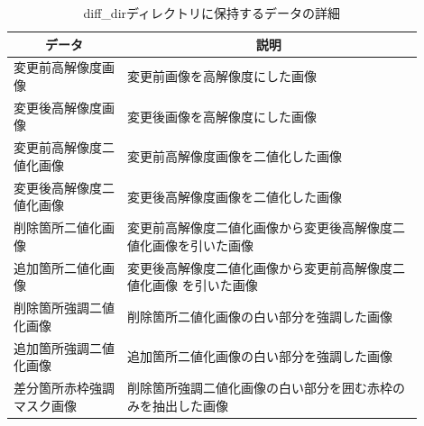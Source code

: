 \begin{table}[tp]
    \caption{diff\_dirディレクトリに保持するデータの詳細}
    \label{tb: diff_dir_data}
    \centering
    \footnotesize
    \begin{tabular}{p{0.25\linewidth}|p{0.65\linewidth}}
        \hline
        \multicolumn{1}{c|}{データ} & \multicolumn{1}{c}{説明}                                                                                                              \\
        \hline \hline
        変更前高解像度画像          & 変更前画像を高解像度にした画像                                                                                                        \\ \hline
        変更後高解像度画像          & 変更後画像を高解像度にした画像                                                                                                        \\ \hline
        変更前高解像度二値化画像    & 変更前高解像度画像を二値化した画像                                                                                                    \\ \hline
        変更後高解像度二値化画像    & 変更後高解像度画像を二値化した画像                                                                                                    \\ \hline
        削除箇所二値化画像          & 変更前高解像度二値化画像から変更後高解像度二値化画像を引いた画像                                                                      \\ \hline
        追加箇所二値化画像          & 変更後高解像度二値化画像から変更前高解像度二値化画像                                                                     を引いた画像 \\ \hline
        削除箇所強調二値化画像      & 削除箇所二値化画像の白い部分を強調した画像                                                                                            \\ \hline
        追加箇所強調二値化画像      & 追加箇所二値化画像の白い部分を強調した画像                                                                                            \\ \hline
        差分箇所赤枠強調マスク画像  & 削除箇所強調二値化画像の白い部分を囲む赤枠のみを抽出した画像                                                                          \\ \hline

\end{tabular}
\end{table}
